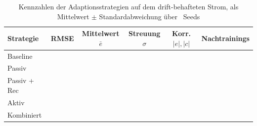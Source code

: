 \begin{table}[tbp]
\centering
\caption{Kennzahlen der Adaptionsstrategien auf dem drift-behafteten Strom, als Mittelwert $\pm$ Standardabweichung über \tepadaptNSeeds\ Seeds}
\label{tab:tep_adaptation_stats}
\begin{tabular}{lccccc}
\toprule
\textbf{Strategie} & \ac{RMSE} & Mittelwert $\bar{e}$ & Streuung $\sigma$ & Korr. $|e|,|c|$ & Nachtrainings \\
\midrule
Baseline     & \adaptpm{\tepadaptBaselineRmse}{\tepadaptBaselineRmseStd} & \adaptpm{\tepadaptBaselineBias}{\tepadaptBaselineBiasStd} & \adaptpm{\tepadaptBaselineSigma}{\tepadaptBaselineSigmaStd} & \adaptpm{\tepadaptBaselineCorrAbs}{\tepadaptBaselineCorrAbsStd} & \adaptpm{\tepadaptBaselineNTrain}{\tepadaptBaselineNTrainStd} \\
Passiv       & \adaptpm{\tepadaptBlindRmse}{\tepadaptBlindRmseStd}       & \adaptpm{\tepadaptBlindBias}{\tepadaptBlindBiasStd}       & \adaptpm{\tepadaptBlindSigma}{\tepadaptBlindSigmaStd}       & \adaptpm{\tepadaptBlindCorrAbs}{\tepadaptBlindCorrAbsStd}       & \adaptpm{\tepadaptBlindNTrain}{\tepadaptBlindNTrainStd} \\
Passiv + Rec & \adaptpm{\tepadaptBlindRecRmse}{\tepadaptBlindRecRmseStd} & \adaptpm{\tepadaptBlindRecBias}{\tepadaptBlindRecBiasStd} & \adaptpm{\tepadaptBlindRecSigma}{\tepadaptBlindRecSigmaStd} & \adaptpm{\tepadaptBlindRecCorrAbs}{\tepadaptBlindRecCorrAbsStd} & \adaptpm{\tepadaptBlindRecNTrain}{\tepadaptBlindRecNTrainStd} \\
Aktiv        & \adaptpm{\tepadaptInformedRmse}{\tepadaptInformedRmseStd} & \adaptpm{\tepadaptInformedBias}{\tepadaptInformedBiasStd} & \adaptpm{\tepadaptInformedSigma}{\tepadaptInformedSigmaStd} & \adaptpm{\tepadaptInformedCorrAbs}{\tepadaptInformedCorrAbsStd} & \adaptpm{\tepadaptInformedNTrain}{\tepadaptInformedNTrainStd} \\
Kombiniert   & \adaptpm{\tepadaptCombinedRmse}{\tepadaptCombinedRmseStd} & \adaptpm{\tepadaptCombinedBias}{\tepadaptCombinedBiasStd} & \adaptpm{\tepadaptCombinedSigma}{\tepadaptCombinedSigmaStd} & \adaptpm{\tepadaptCombinedCorrAbs}{\tepadaptCombinedCorrAbsStd} & \adaptpm{\tepadaptCombinedNTrain}{\tepadaptCombinedNTrainStd} \\
\bottomrule
\end{tabular}
\vspace{5mm}
\end{table}
%
